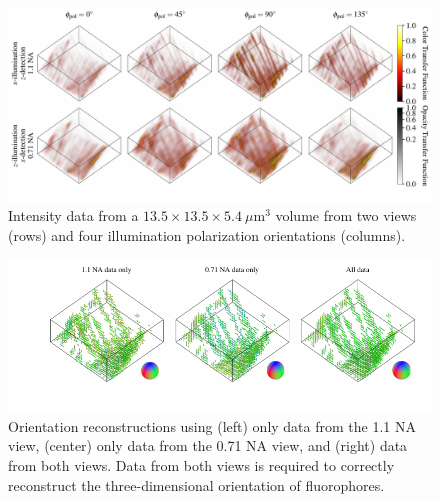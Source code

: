 \documentclass[letterpaper,10pt]{article}
\begin{document}
\begin{figure}[htbp]
  \centering
  \includegraphics[width=16.cm, trim={0.1cm 1.3cm 0 0.5cm}]{figs/roi2/data.pdf}
  \caption{Intensity data from a $13.5\times 13.5\times 5.4\ \mu$m${}^3$ volume
    from two views (rows) and four illumination polarization orientations
    (columns).}
\end{figure}
\vspace{0.1em}
\begin{figure}[htbp]
  \centering
  \includegraphics[width=16.0cm, trim={1cm 1.2cm 0 0.8cm}]{figs/roi2/recon.pdf}
  \caption{Orientation reconstructions using (left) only data from the 1.1 NA
    view, (center) only data from the 0.71 NA view, and (right) data from both
    views. Data from both views is required to correctly reconstruct the
    three-dimensional orientation of fluorophores.}
\end{figure}
\vspace{-2.5em}
{\footnotesize{}}

\end{document}
